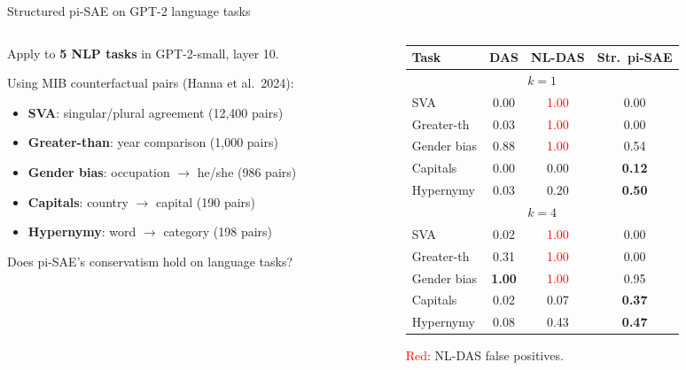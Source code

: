 \documentclass[aspectratio=169,11pt]{beamer}
\begin{document}
\begin{frame}{Structured pi-SAE on GPT-2 language tasks}
\vspace{-0.3em}

\begin{columns}[T]
\begin{column}{0.50\textwidth}
{\small Apply to \textbf{5 NLP tasks} in GPT-2-small, layer 10.}

\vspace{0.2em}
{\scriptsize Using MIB counterfactual pairs (Hanna et al.\ 2024):}
\begin{itemize}\setlength{\itemsep}{0pt}
  \item {\scriptsize \textbf{SVA}: singular/plural agreement (12,400 pairs)}
  \item {\scriptsize \textbf{Greater-than}: year comparison (1,000 pairs)}
  \item {\scriptsize \textbf{Gender bias}: occupation $\to$ he/she (986 pairs)}
  \item {\scriptsize \textbf{Capitals}: country $\to$ capital (190 pairs)}
  \item {\scriptsize \textbf{Hypernymy}: word $\to$ category (198 pairs)}
\end{itemize}

\vspace{0.2em}
{\scriptsize Does pi-SAE's conservatism hold on language tasks?}
\end{column}
\begin{column}{0.48\textwidth}
{\scriptsize\centering
\renewcommand{\arraystretch}{1.05}
\begin{tabular}{l|ccc}
\toprule
\textbf{Task} & \textbf{DAS} & \textbf{NL-DAS} & \textbf{Str.\ pi-SAE} \\
\midrule
\multicolumn{4}{c}{\textit{$k = 1$}} \\
\midrule
SVA        & 0.00 & \textcolor{red}{1.00} & 0.00 \\
Greater-th & 0.03 & \textcolor{red}{1.00} & 0.00 \\
Gender bias& 0.88 & \textcolor{red}{1.00} & 0.54 \\
Capitals   & 0.00 & 0.00 & \textbf{0.12} \\
Hypernymy  & 0.03 & 0.20 & \textbf{0.50} \\
\midrule
\multicolumn{4}{c}{\textit{$k = 4$}} \\
\midrule
SVA        & 0.02 & \textcolor{red}{1.00} & 0.00 \\
Greater-th & 0.31 & \textcolor{red}{1.00} & 0.00 \\
Gender bias& \textbf{1.00} & \textcolor{red}{1.00} & 0.95 \\
Capitals   & 0.02 & 0.07 & \textbf{0.37} \\
Hypernymy  & 0.08 & 0.43 & \textbf{0.47} \\
\bottomrule
\end{tabular}
}

\vspace{0.2em}
{\scriptsize \textcolor{red}{Red}: NL-DAS false positives.}
\end{column}
\end{columns}
\end{frame}
\end{document}
